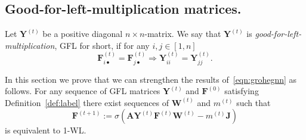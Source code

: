 \subsection{Good-for-left-multiplication matrices.}\label{subsec:left}
\begin{definition}\label{def:gfl}
Let  $\mathbf{Y}^{(t)}$ be a positive diagonal $n\times n$-matrix. We say that $\mathbf{Y}^{(t)}$ is \emph{good-for-left-multiplication}, GFL for short, if for any $i,j\in[1,n]$
\begin{equation}
\mathbf{F}_{i\bullet}^{(t)}=\mathbf{F}_{j\bullet}^{(t)} \Longrightarrow \mathbf{Y}^{(t)}_{ii}=\mathbf{Y}^{(t)}_{jj}. \label{eq:cond1}
\end{equation}
\end{definition}

In this section we prove that we can strengthen the results of~\eqref{eqn:grohegnn} as follows. For any sequence of GFL matrices $\mathbf{Y}^{(t)}$ and $\mathbf{F}^{(0)}$ satisfying Definition~\ref{def:label} there exist sequences of $\mathbf{W}^{(t)}$ and $m^{(t)}$ such that
\begin{equation}
\mathbf{F}^{(t+1)}:=\sigma(\mathbf{A}\mathbf{Y}^{(t)}\mathbf{F}^{(t)}\mathbf{W}^{(t)} - m^{(t)}\mathbf{J})
\end{equation}
is equivalent to 1-WL.

